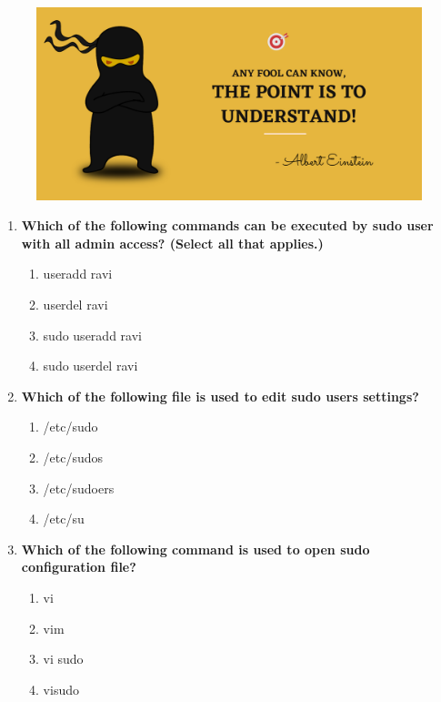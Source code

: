 \setlength{\columnsep}{3pt}
\begin{flushleft}
	\paragraph{}

\bigskip

\begin{figure}[h!]
	\centering
	\includegraphics[scale=.2]{content/practise.jpg}
\end{figure}	
\begin{enumerate}
	\item \textbf{Which of the following commands can be executed by \textbf{sudo} user with all admin access? (Select all that applies.)}
	\begin{enumerate}[label=(\alph*)]
		\item useradd ravi
		\item userdel ravi
		\item sudo useradd ravi   %
		\item sudo userdel ravi   %
	\end{enumerate}
	\bigskip
	\bigskip	
	
	\item \textbf{Which of the following file is used to edit sudo users settings?}
	\begin{enumerate}[label=(\alph*)]
		\item /etc/sudo
		\item /etc/sudos
		\item /etc/sudoers   %
		\item /etc/su
	\end{enumerate}
	\bigskip
	\bigskip
	\item \textbf{Which of the following command is used to open sudo configuration file?}
	\begin{enumerate}[label=(\alph*)]
		\item vi
		\item vim
		\item vi sudo
		\item visudo   %
	\end{enumerate}
\end{enumerate}

	
\end{flushleft}

\newpage

